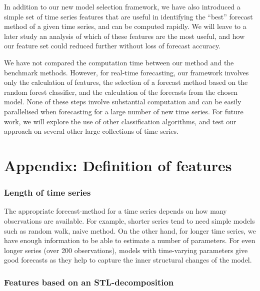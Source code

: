 \documentclass[11pt,a4paper,]{article}
\theoremstyle{definition}
\theoremstyle{definition}
\theoremstyle{definition}
\theoremstyle{remark}
\begin{document}
In addition to our new model selection framework, we have also
introduced a simple set of time series features that are useful in
identifying the ``best'' forecast method of a given time series, and can
be computed rapidly. We will leave to a later study an analysis of which
of these features are the most useful, and how our feature set could
reduced further without loss of forecast accuracy.

We have not compared the computation time between our method and the
benchmark methods. However, for real-time forecasting, our framework
involves only the calculation of features, the selection of a forecast
method based on the random forest classifier, and the calculation of the
forecasts from the chosen model. None of these steps involve substantial
computation and can be easily parallelised when forecasting for a large
number of new time series. For future work, we will explore the use of
other classification algorithms, and test our approach on several other
large collections of time series.

\newpage

\section*{Appendix: Definition of
features}\label{appendix-definition-of-features}

\subsubsection*{Length of time series}\label{length-of-time-series}

The appropriate forecast-method for a time series depends on how many
observations are available. For example, shorter series tend to need
simple models such as random walk, naive method. On the other hand, for
longer time series, we have enough information to be able to estimate a
number of parameters. For even longer series (over 200 observations),
models with time-varying parameters give good forecasts as they help to
capture the inner structural changes of the model.

\subsubsection*{Features based on an
STL-decomposition}\label{features-based-on-an-stl-decomposition}
\end{document}
